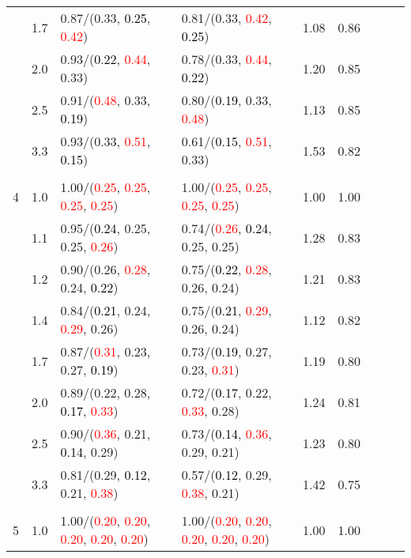 \documentclass[10pt,a4paper]{report}
\begin{document}
\begin{table}[!htbp]
\begin{center}
{\begin{tabular}{ccllccccc}
			&1.7&0.87/(0.33, \textcolor{black}{0.25}, \textcolor{red}{0.42})&0.81/(0.33, \textcolor{red}{0.42}, \textcolor{black}{0.25})&1.08&0.86\\
			&2.0&0.93/(\textcolor{black}{0.22}, \textcolor{red}{0.44}, 0.33)&0.78/(0.33, \textcolor{red}{0.44}, \textcolor{black}{0.22})&1.20&0.85\\
			&2.5&0.91/(\textcolor{red}{0.48}, 0.33, \textcolor{black}{0.19})&0.80/(\textcolor{black}{0.19}, 0.33, \textcolor{red}{0.48})&1.13&0.85\\
			&3.3&0.93/(0.33, \textcolor{red}{0.51}, \textcolor{black}{0.15})&0.61/(\textcolor{black}{0.15}, \textcolor{red}{0.51}, 0.33)&1.53&0.82\\
			&&&&\\
			4			&1.0&1.00/(\textcolor{red}{0.25}, \textcolor{red}{0.25}, \textcolor{red}{0.25}, \textcolor{red}{0.25})&1.00/(\textcolor{red}{0.25}, \textcolor{red}{0.25}, \textcolor{red}{0.25}, \textcolor{red}{0.25})&1.00&1.00\\
			&1.1&0.95/(\textcolor{black}{0.24}, 0.25, 0.25, \textcolor{red}{0.26})&0.74/(\textcolor{red}{0.26}, \textcolor{black}{0.24}, 0.25, 0.25)&1.28&0.83\\
			&1.2&0.90/(0.26, \textcolor{red}{0.28}, 0.24, \textcolor{black}{0.22})&0.75/(\textcolor{black}{0.22}, \textcolor{red}{0.28}, 0.26, 0.24)&1.21&0.83\\
			&1.4&0.84/(\textcolor{black}{0.21}, 0.24, \textcolor{red}{0.29}, 0.26)&0.75/(\textcolor{black}{0.21}, \textcolor{red}{0.29}, 0.26, 0.24)&1.12&0.82\\
			&1.7&0.87/(\textcolor{red}{0.31}, 0.23, 0.27, \textcolor{black}{0.19})&0.73/(\textcolor{black}{0.19}, 0.27, 0.23, \textcolor{red}{0.31})&1.19&0.80\\
			&2.0&0.89/(0.22, 0.28, \textcolor{black}{0.17}, \textcolor{red}{0.33})&0.72/(\textcolor{black}{0.17}, 0.22, \textcolor{red}{0.33}, 0.28)&1.24&0.81\\
			&2.5&0.90/(\textcolor{red}{0.36}, 0.21, \textcolor{black}{0.14}, 0.29)&0.73/(\textcolor{black}{0.14}, \textcolor{red}{0.36}, 0.29, 0.21)&1.23&0.80\\
			&3.3&0.81/(0.29, \textcolor{black}{0.12}, 0.21, \textcolor{red}{0.38})&0.57/(\textcolor{black}{0.12}, 0.29, \textcolor{red}{0.38}, 0.21)&1.42&0.75\\
			&&&&\\
			5			&1.0&1.00/(\textcolor{red}{0.20}, \textcolor{red}{0.20}, \textcolor{red}{0.20}, \textcolor{red}{0.20}, \textcolor{red}{0.20})&1.00/(\textcolor{red}{0.20}, \textcolor{red}{0.20}, \textcolor{red}{0.20}, \textcolor{red}{0.20}, \textcolor{red}{0.20})&1.00&1.00\\

\end{tabular}}
\end{center}
\end{table}
\end{document}
